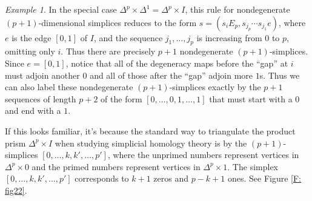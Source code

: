\documentclass[12pt]{article}
\theoremstyle{plain}
\theoremstyle{definition}
\theoremstyle{remark}
\newtheorem{example}[theorem]{Example}
\begin{document}
\begin{example}
In the special case $\Delta^p\times \Delta^1=\Delta^p\times I$, this rule for nondegenerate $(p+1)$-dimensional simplices reduces to the form $s=(s_i E_p, s_{j_p}\cdots s_{j_1} e)$, where $e$ is the edge $[0,1]$ of $I$, and the sequence $j_1,\ldots, j_p$ is increasing from $0$ to $p$, omitting only $i$. Thus there are precisely $p+1$ nondegenerate $(p+1)$-simplices. Since $e=[0,1]$, notice that all of the degeneracy maps before the ``gap'' at $i$ must adjoin another $0$ and all of those after the ``gap'' adjoin more $1$s. Thus we can also label these nondegenerate $(p+1)$-simplices exactly by the $p+1$ sequences of length $p+2$ of the form $[0,\ldots, 0,1,\ldots,1]$ that must start with a $0$ and end with a $1$.

If this looks familiar, it's because the standard way to triangulate the product prism $\Delta^p\times I$ when studying simplicial homology theory is by the $(p+1)$-simplices $[0,\ldots, k,k',\ldots, p']$, where  the unprimed numbers represent vertices in $\Delta^p\times 0$ and the primed numbers represent vertices in $\Delta^p\times 1$. The simplex $[0,\ldots,k,k',\ldots, p']$ corresponds to $k+1$ zeros and $p-k+1$ ones. See Figure \ref{F: fig22}.



\end{example}
\end{document}
